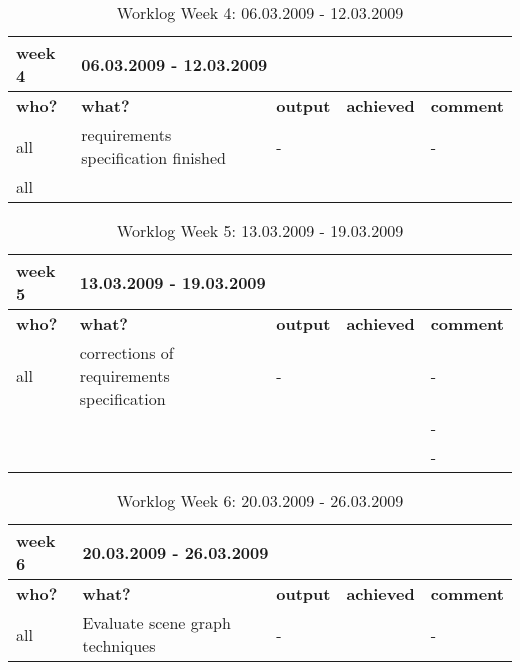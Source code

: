 \begin{table}[H]
	\centering
	\begin{tabular}{|b{}|p{}|p{}|p{}|p{}|}
		\hline \bfseries week 4 & \multicolumn{4}{l|}{\bfseries 06.03.2009 - 12.03.2009} \\
		\hline
		\hline \bfseries who? & \bfseries what? & \bfseries output & \bfseries achieved & \bfseries comment \\ 
		\hline all & requirements specification finished & \quad\quad- & \tick & \quad\quad- \\
		\hline
		\hline all & \multicolumn{4}{l|}{\color{red}{\bfseries 13.03.09: Appointment with Expert: H. van der Kleij}} \\
		\hline
	\end{tabular}
	\caption{Worklog Week 4: 06.03.2009 - 12.03.2009}
\end{table}


\begin{table}[H]
	\centering
	\begin{tabular}{|b{}|p{}|p{}|p{}|p{}|}
		\hline \bfseries week 5 & \multicolumn{4}{l|}{\bfseries 13.03.2009 - 19.03.2009} \\
		\hline
		\hline \bfseries who? & \bfseries what? & \bfseries output & \bfseries achieved & \bfseries comment \\ 
		\hline all & corrections of requirements specification & \quad\quad- & \tick & \quad\quad- \\
		\hline
		\hline \color{red}{\bfseries M1} & \multicolumn{2}{l|}{\color{red}{\bfseries Functional specification}} & \tick & \quad\quad- \\
		\hline \color{red}{\bfseries M2} & \multicolumn{2}{l|}{\color{red}{\bfseries Prototype finished}} & \tick & \quad\quad- \\
		\hline
	\end{tabular}
	\caption{Worklog Week 5: 13.03.2009 - 19.03.2009}
\end{table}


\begin{table}[H]
	\centering
	\begin{tabular}{|b{}|p{}|p{}|p{}|p{}|}
		\hline \bfseries week 6 & \multicolumn{4}{l|}{\bfseries 20.03.2009 - 26.03.2009} \\
		\hline
		\hline \bfseries who? & \bfseries what? & \bfseries output & \bfseries achieved & \bfseries comment \\ 
		\hline all & Evaluate scene graph techniques & \quad\quad- & \tick & \quad\quad- \\
		\hline
	\end{tabular}
	\caption{Worklog Week 6: 20.03.2009 - 26.03.2009}
\end{table}

